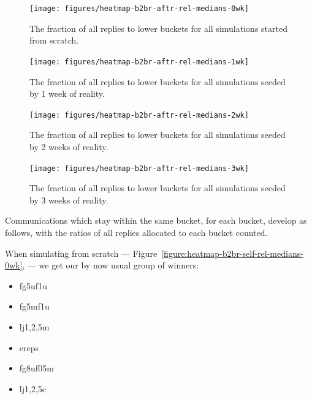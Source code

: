 \documentclass[10pt,oneside]{memoir}
\begin{document}
\begin{figure}
\begin{center}
    \texttt{[image: figures/heatmap-b2br-aftr-rel-medians-0wk]}
    \caption{The fraction of all replies to lower buckets for all simulations started from scratch.}
    \label{figure:heatmap-b2br-aftr-rel-medians-0wk}
\end{center}
\end{figure}

\begin{figure}
\begin{center}
    \texttt{[image: figures/heatmap-b2br-aftr-rel-medians-1wk]}
    \caption{The fraction of all replies to lower buckets for all simulations seeded by 1 week of reality.}
    \label{figure:heatmap-b2br-aftr-rel-medians-1wk}
\end{center}
\end{figure}

\begin{figure}
\begin{center}
    \texttt{[image: figures/heatmap-b2br-aftr-rel-medians-2wk]}
    \caption{The fraction of all replies to lower buckets for all simulations seeded by 2 weeks of reality.}
    \label{figure:heatmap-b2br-aftr-rel-medians-2wk}
\end{center}
\end{figure}

\begin{figure}
\begin{center}
    \texttt{[image: figures/heatmap-b2br-aftr-rel-medians-3wk]}
    \caption{The fraction of all replies to lower buckets for all simulations seeded by 3 weeks of reality.}
    \label{figure:heatmap-b2br-aftr-rel-medians-3wk}
\end{center}
\end{figure}
Communications which stay within the same bucket, for each bucket, develop as follows, with the ratios of all replies allocated to each bucket counted.


When simulating from scratch --- Figure~\ref{figure:heatmap-b2br-self-rel-medians-0wk}, --- we get our by now usual group of winners:


\begin{itemize}


\item fg5uf1u

\item fg5mf1u

\item lj{1,2,5}m

\item ereps




\item fg8uf05m




\item lj{1,2,5}c
\end{itemize}
\end{document}
